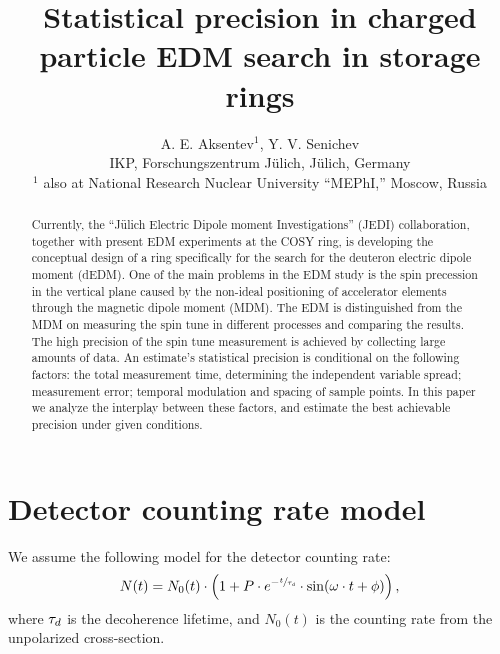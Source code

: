 \documentclass{jacow}
\begin{document}
\title{Statistical precision in charged particle EDM search in storage rings}
\author{A. E. Aksentev$^1$\footnotemark[2], Y. V. Senichev  \\IKP, Forschungszentrum J\"ulich, J\"ulich, Germany \\$^1$ also at National Research Nuclear University ``MEPhI,'' Moscow, Russia}
\maketitle
{}

\begin{abstract}
	Currently, the ``J\"ulich Electric Dipole moment Investigations'' (JEDI) collaboration, together with present EDM experiments at the COSY ring, is developing the conceptual design of a ring specifically for the search for the deuteron electric dipole moment (dEDM). One of the main problems in the EDM study is the spin precession in the vertical plane caused by the non-ideal positioning of accelerator elements through the magnetic dipole moment (MDM). The EDM is distinguished from the MDM  on measuring the spin tune in different processes and comparing the results. The high precision of the spin tune measurement is achieved by collecting large amounts of data. An estimate's statistical precision is conditional on the following factors: the total measurement time, determining the independent variable spread; measurement error; temporal modulation and spacing of sample points. In this paper we analyze the interplay between these factors, and estimate the best achievable precision under given conditions.
\end{abstract}

\section{Detector counting rate model}
We assume the following model for the detector counting rate:
\begin{equation}\label{eq:DetCntRt}
	N(t) = N_0(t)\cdot\bkt{1 + P\cdot e^{-\sfrac{t}{\LTd}}\cdot\sin(\omega\cdot t + \phi)},
\end{equation}
where $\tau_d$ is the decoherence lifetime, and $N_0(t)$ is the counting rate from the unpolarized cross-section.
\end{document}
